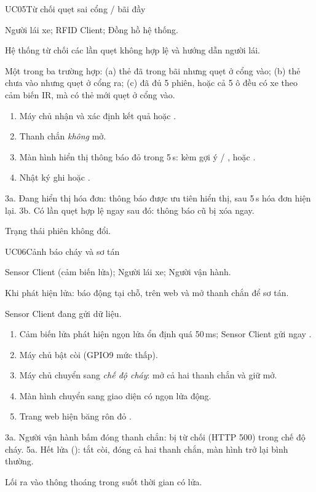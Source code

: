 \begin{usecase}{UC05}{Từ chối quẹt sai cổng / bãi đầy}
\item[Tác nhân] Người lái xe; RFID Client; Đồng hồ hệ thống.
\item[Mô tả] Hệ thống từ chối các lần quẹt không hợp lệ và hướng dẫn người lái.
\item[Tiền điều kiện] Một trong ba trường hợp: (a) thẻ đã trong bãi nhưng quẹt ở cổng vào;
  (b) thẻ chưa vào nhưng quẹt ở cổng ra; (c) đã đủ 5 phiên, hoặc cả 5 ô đều có xe theo cảm biến IR, mà có thẻ mới quẹt ở cổng vào.
\item[Luồng chính] \begin{enumerate}[nosep,leftmargin=1.3em]
  \item Máy chủ nhận  và xác định kết quả  hoặc .
  \item Thanh chắn \emph{không} mở.
  \item Màn hình hiển thị thông báo đỏ trong 5\,s:  kèm gợi ý
         / ,
        hoặc .
  \item Nhật ký ghi  hoặc .
\end{enumerate}
\item[Ngoại lệ] 3a. Đang hiển thị hóa đơn: thông báo được ưu tiên hiển thị, sau 5\,s hóa đơn hiện lại.
  3b. Có lần quẹt hợp lệ ngay sau đó: thông báo cũ bị xóa ngay.
\item[Hậu điều kiện] Trạng thái phiên không đổi.
\end{usecase}

\begin{usecase}{UC06}{Cảnh báo cháy và sơ tán}
\item[Tác nhân] Sensor Client (cảm biến lửa); Người lái xe; Người vận hành.
\item[Mô tả] Khi phát hiện lửa: báo động tại chỗ, trên web và mở thanh chắn để sơ tán.
\item[Tiền điều kiện] Sensor Client đang gửi dữ liệu.
\item[Luồng chính] \begin{enumerate}[nosep,leftmargin=1.3em]
  \item Cảm biến lửa phát hiện ngọn lửa ổn định quá 50\,ms; Sensor Client gửi ngay .
  \item Máy chủ bật còi (GPIO9 mức thấp).
  \item Máy chủ chuyển sang \emph{chế độ cháy}: mở cả hai thanh chắn và giữ mở.
  \item Màn hình chuyển sang giao diện  có ngọn lửa động.
  \item Trang web hiện băng rôn đỏ .
\end{enumerate}
\item[Ngoại lệ] 3a. Người vận hành bấm đóng thanh chắn: bị từ chối (HTTP 500) trong chế độ cháy.
  5a. Hết lửa (): tắt còi, đóng cả hai thanh chắn, màn hình trở lại bình thường.
\item[Hậu điều kiện] Lối ra vào thông thoáng trong suốt thời gian có lửa.
\end{usecase}

